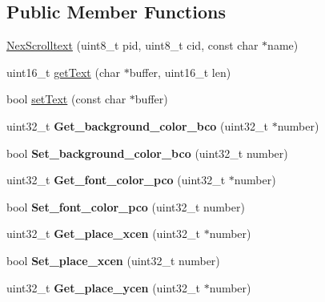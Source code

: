 \subsection*{Public Member Functions}
\begin{DoxyCompactItemize}
\item 
\hyperlink{class_nex_scrolltext_a212aa1505ed7c0bfdb47de3e6e2045fb}{Nex\+Scrolltext} (uint8\+\_\+t pid, uint8\+\_\+t cid, const char $\ast$name)
\item 
uint16\+\_\+t \hyperlink{class_nex_scrolltext_a7cead053146075e7c31d43349d4c897c}{get\+Text} (char $\ast$buffer, uint16\+\_\+t len)
\item 
bool \hyperlink{class_nex_scrolltext_a71b8e2b2bff22e3c0cbdf961a55b8d12}{set\+Text} (const char $\ast$buffer)
\item 
\hypertarget{class_nex_scrolltext_ac3861fec5efd8cde4535307f231244e7}{uint32\+\_\+t {\bfseries Get\+\_\+background\+\_\+color\+\_\+bco} (uint32\+\_\+t $\ast$number)}\label{class_nex_scrolltext_ac3861fec5efd8cde4535307f231244e7}

\item 
\hypertarget{class_nex_scrolltext_a50a5211fc6913b97afda045a762cb0c4}{bool {\bfseries Set\+\_\+background\+\_\+color\+\_\+bco} (uint32\+\_\+t number)}\label{class_nex_scrolltext_a50a5211fc6913b97afda045a762cb0c4}

\item 
\hypertarget{class_nex_scrolltext_a266a3c44131eec0a40b1e12f6cf7d3a1}{uint32\+\_\+t {\bfseries Get\+\_\+font\+\_\+color\+\_\+pco} (uint32\+\_\+t $\ast$number)}\label{class_nex_scrolltext_a266a3c44131eec0a40b1e12f6cf7d3a1}

\item 
\hypertarget{class_nex_scrolltext_ac34d68211c4c3c70834c7e7e49ece03f}{bool {\bfseries Set\+\_\+font\+\_\+color\+\_\+pco} (uint32\+\_\+t number)}\label{class_nex_scrolltext_ac34d68211c4c3c70834c7e7e49ece03f}

\item 
\hypertarget{class_nex_scrolltext_a066d8439ea088a7ef604abb87802add6}{uint32\+\_\+t {\bfseries Get\+\_\+place\+\_\+xcen} (uint32\+\_\+t $\ast$number)}\label{class_nex_scrolltext_a066d8439ea088a7ef604abb87802add6}

\item 
\hypertarget{class_nex_scrolltext_a5126fc70854f0f12f1573ee1eb8959b0}{bool {\bfseries Set\+\_\+place\+\_\+xcen} (uint32\+\_\+t number)}\label{class_nex_scrolltext_a5126fc70854f0f12f1573ee1eb8959b0}

\item 
\hypertarget{class_nex_scrolltext_a987a74978f764f74540c8ee0de200564}{uint32\+\_\+t {\bfseries Get\+\_\+place\+\_\+ycen} (uint32\+\_\+t $\ast$number)}\label{class_nex_scrolltext_a987a74978f764f74540c8ee0de200564}


\end{DoxyCompactItemize}
